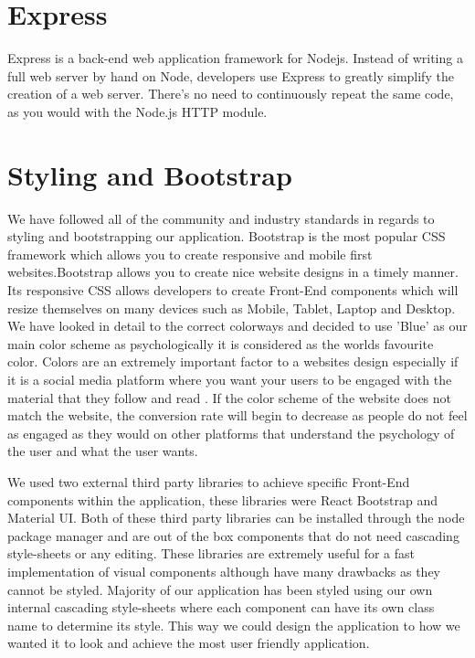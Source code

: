 \section{Express}
Express is a back-end web application framework for Nodejs. Instead of writing a full web server by hand on Node, developers use Express to greatly simplify the creation of a web server. There’s no need to continuously repeat the same code, as you would with the Node.js HTTP module.

\section{Styling and Bootstrap}
We have followed all of the community and industry standards in regards to styling and bootstrapping our application. Bootstrap is the most popular CSS framework which allows you to create responsive and mobile first websites.Bootstrap allows you to create nice website designs in a timely manner. Its responsive CSS allows developers to create Front-End components which will resize themselves on many devices such as Mobile, Tablet, Laptop and Desktop. We have looked in detail to the correct colorways and decided to use 'Blue' as our main color scheme as psychologically it is considered as the worlds favourite color. Colors are an extremely important factor to a websites design especially if it is a social media platform where you want your users to be engaged with the material that they follow and read \cite{singh2011impact}. If the color scheme of the website does not match the website, the conversion rate will begin to decrease as people do not feel as engaged as they would on other platforms that understand the psychology of the user and what the user wants.

We used two external third party libraries to achieve specific Front-End components within the application, these libraries were React Bootstrap and Material UI. Both of these third party libraries can be installed through the node package manager and are out of the box components that do not need cascading style-sheets or any editing. These libraries are extremely useful for a fast implementation of visual components although have many drawbacks as they cannot be styled. Majority of our application has been styled using our own internal cascading style-sheets where each component can have its own class name to determine its style. This way we could design the application to how we wanted it to look and achieve the most user friendly application.

